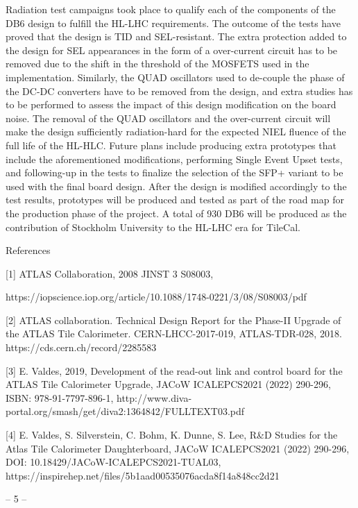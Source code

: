 \documentclass{article}
\begin{document}
Radiation test campaigns took place to qualify each of the components of the DB6 design to fulfill 
the   HL-LHC   requirements. 
The   outcome   of   the   tests   have   proved   that   the   design   is   TID   and 
SEL-resistant.   The   extra   protection   added   to   the   design   for   SEL   appearances   in   the   form   of   a 
over-current   circuit   has   to   be   removed   due   to   the   shift   in   the   threshold   of   the   MOSFETS   used   in 
the   implementation.   Similarly,   the   QUAD   oscillators   used   to   de-couple   the   phase   of   the   DC-DC 
converters   have   to   be   removed   from   the   design,   and   extra   studies   has   to   be   performed   to   assess 
the   impact   of   this   design   modification   on   the   board   noise.   The   removal   of   the   QUAD   oscillators 
and the over-current circuit will make the design sufficiently radiation-hard for the expected NIEL 
fluence of the full life of the HL-HLC. Future plans include producing extra prototypes that include 
the   aforementioned   modifications,   performing   Single   Event   Upset   tests,   and   following-up   in   the 
tests to finalize the selection of the SFP+ variant to be used with the final board design.   After the 
design is modified accordingly to the test results, prototypes will be produced and tested as part of 
the road map for the production phase of the project.   A total of 930 DB6 will be produced as the 
contribution of Stockholm University to the HL-LHC era for TileCal.

References

[1]   ATLAS Collaboration, 2008 JINST 3 S08003,

https://iopscience.iop.org/article/10.1088/1748-0221/3/08/S08003/pdf

[2]   ATLAS collaboration. Technical Design Report for the Phase-II Upgrade of the ATLAS Tile 
Calorimeter. CERN-LHCC-2017-019, ATLAS-TDR-028, 2018. 
https://cds.cern.ch/record/2285583

[3]   E. Valdes, 2019, Development of the read-out link and control board for the ATLAS Tile Calorimeter 
Upgrade, JACoW ICALEPCS2021 (2022) 290-296, ISBN: 978-91-7797-896-1, 
http://www.diva-portal.org/smash/get/diva2:1364842/FULLTEXT03.pdf

[4]   E. Valdes, S. Silverstein, C. Bohm, K. Dunne, S. Lee, R\&D Studies for the Atlas Tile Calorimeter 
Daughterboard, JACoW ICALEPCS2021 (2022) 290-296, DOI: 
10.18429/JACoW-ICALEPCS2021-TUAL03, 
https://inspirehep.net/files/5b1aad00535076acda8f14a848cc2d21

-- 5 --
\end{document}
